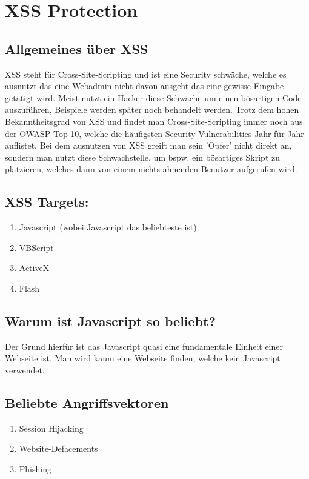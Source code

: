 \section{XSS Protection}
\label{sec:xss}
\subsection{Allgemeines über XSS}
\label{sec:xss_allgemein}
XSS steht für Cross-Site-Scripting und ist eine Security schwäche, welche es ausnutzt das eine Webadmin nicht davon ausgeht das eine gewisse Eingabe getätigt wird. Meist nutzt ein Hacker diese Schwäche um einen bösartigen Code auszuführen, Beispiele werden später noch behandelt werden. Trotz dem hohen Bekanntheitsgrad von XSS und findet man Cross-Site-Scripting immer noch aus der OWASP Top 10, welche die häufigsten Security Vulnerabilities Jahr für Jahr auflistet. Bei dem ausnutzen von XSS greift man sein 'Opfer' nicht direkt an, sondern man nutzt diese Schwachstelle, um bspw. ein bösartiges Skript zu platzieren, welches dann von einem nichts ahnenden Benutzer aufgerufen wird. 
\subsection{XSS Targets:}
\label{sec:xss_targets}
\begin{enumerate}
\item Javascript (wobei Javascript das beliebteste ist) 
\item VBScript 
\item ActiveX
\item Flash
\end{enumerate}
\subsection{Warum ist Javascript so beliebt?}
\label{sec:xss_why}
Der Grund hierfür ist das Javascript quasi eine fundamentale Einheit einer Webseite ist. Man wird kaum eine Webseite finden, welche kein Javascript verwendet.
\subsection{Beliebte Angriffsvektoren}
\label{sec:xss_bel_agg}
\begin{enumerate}
\item Session Hijacking
\item Website-Defacements 
\item Phishing
\end{enumerate}
\textcite{XSS}
